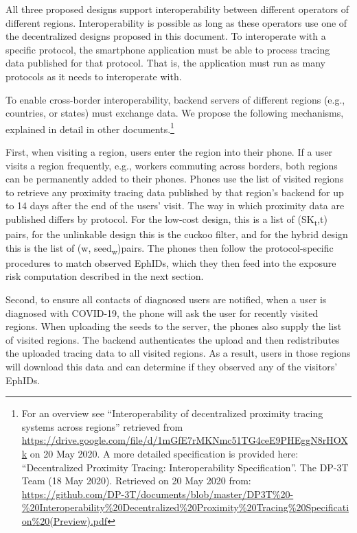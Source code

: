 \documentclass{article}
\begin{document}
All three proposed designs support interoperability between different
operators of different regions. Interoperability is possible as long as
these operators use one of the decentralized designs proposed in this
document. To interoperate with a specific protocol, the smartphone
application must be able to process tracing data published for that
protocol. That is, the application must run as many protocols as it
needs to interoperate with.

To enable cross-border interoperability, backend servers of different
regions (e.g., countries, or states) must exchange data. We propose the
following mechanisms, explained in detail in other documents.\footnote{For
  an overview see ``Interoperability of decentralized proximity tracing
  systems across regions'' retrieved from
  \href{https://drive.google.com/file/d/1mGfE7rMKNmc51TG4ceE9PHEggN8rHOXk}{{https://drive.google.com/file/d/1mGfE7rMKNmc51TG4ceE9PHEggN8rHOXk}}
  on 20 May 2020. A more detailed specification is provided here:
  ``Decentralized Proximity Tracing: Interoperability Specification''.
  The DP-3T Team (18 May 2020). Retrieved on 20 May 2020 from:
  \href{https://github.com/DP-3T/documents/blob/master/DP3T\%20-\%20Interoperability\%20Decentralized\%20Proximity\%20Tracing\%20Specification\%20(Preview).pdf}{{https://github.com/DP-3T/documents/blob/master/DP3T\%20-\%20Interoperability\%20Decentralized\%20Proximity\%20Tracing\%20Specification\%20(Preview).pdf}}}

First, when visiting a region, users enter the region into their phone.
If a user visits a region frequently, e.g., workers commuting across
borders, both regions can be permanently added to their phones. Phones
use the list of visited regions to retrieve any proximity tracing data
published by that region's backend for up to 14 days after the end of
the users' visit. The way in which proximity data are published differs
by protocol. For the low-cost design, this is a list of
(SK\textsubscript{t},t) pairs, for the unlinkable design this is the
cuckoo filter, and for the hybrid design this is the list of (w,
seed\textsubscript{w})pairs. The phones then follow the
protocol-specific procedures to match observed EphIDs, which they then
feed into the exposure risk computation described in the next section.

Second, to ensure all contacts of diagnosed users are notified, when a
user is diagnosed with COVID-19, the phone will ask the user for
recently visited regions. When uploading the seeds to the server, the
phones also supply the list of visited regions. The backend
authenticates the upload and then redistributes the uploaded tracing
data to all visited regions. As a result, users in those regions will
download this data and can determine if they observed any of the
visitors' EphIDs.
\end{document}
